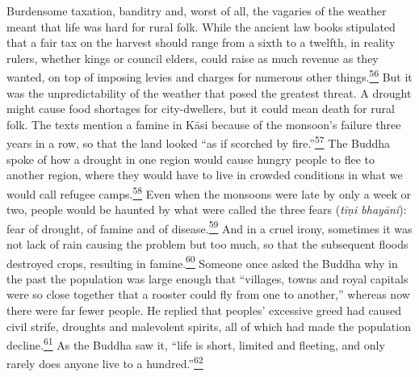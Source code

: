 Burdensome taxation, banditry and, worst of all, the vagaries of the
weather meant that life was hard for rural folk. While the ancient law
books stipulated that a fair tax on the harvest should range from a
sixth to a twelfth, in reality rulers, whether kings or council elders,
could raise as much revenue as they wanted, on top of imposing levies
and charges for numerous other
things.\label{footprints_split_006.html_fnref56}\hyperref[footprints_split_024.htmlux5cux23fn56]{\textsuperscript{56}}
But it was the unpredictability of the weather that posed the greatest
threat. A drought might cause food shortages for city-dwellers, but it
could mean death for rural folk. The texts mention a famine in Kāsi
because of the monsoon's failure three years in a row, so that the land
looked ``as if scorched by
fire.''\label{footprints_split_006.html_fnref57}\hyperref[footprints_split_024.htmlux5cux23fn57]{\textsuperscript{57}}
The Buddha spoke of how a drought in one region would cause hungry
people to flee to another region, where they would have to live in
crowded conditions in what we would call refugee
camps.\label{footprints_split_006.html_fnref58}\hyperref[footprints_split_024.htmlux5cux23fn58]{\textsuperscript{58}}
Even when the monsoons were late by only a week or two, people would be
haunted by what were called the three fears (\emph{tīṇi bhayāni}): fear
of drought, of famine and of
disease.\label{footprints_split_006.html_fnref59}\hyperref[footprints_split_024.htmlux5cux23fn59]{\textsuperscript{59}}
And in a cruel irony, sometimes it was not lack of rain causing the
problem but too much, so that the subsequent floods destroyed crops,
resulting in
famine.\label{footprints_split_006.html_fnref60}\hyperref[footprints_split_024.htmlux5cux23fn60]{\textsuperscript{60}}
Someone once asked the Buddha why in the past the population was large
enough that ``villages, towns and royal capitals were so close together
that a rooster could fly from one to another,'' whereas now there were
far fewer people. He replied that peoples' excessive greed had caused
civil strife, droughts and malevolent spirits, all of which had made the
population
decline.\label{footprints_split_006.html_fnref61}\hyperref[footprints_split_024.htmlux5cux23fn61]{\textsuperscript{61}}
As the Buddha saw it, ``life is short, limited and fleeting, and only
rarely does anyone live to a
hundred.''\label{footprints_split_006.html_fnref62}\hyperref[footprints_split_024.htmlux5cux23fn62]{\textsuperscript{62}}

